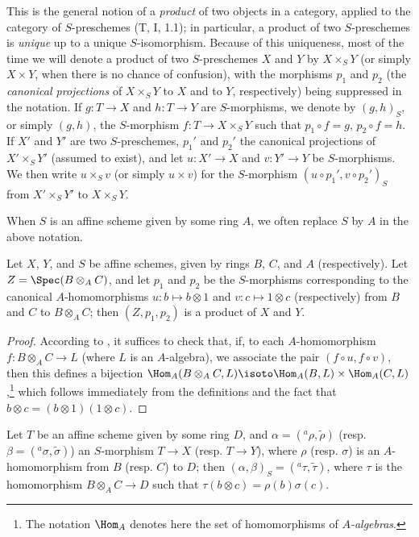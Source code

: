 This is the general notion of a \emph{product} of two objects in a category, applied
to the category of $S$-preschemes (T, I, 1.1); in particular, a product of two $S$-preschemes
is \emph{unique} up to a unique $S$-isomorphism. Because of this uniqueness, most of the time
we will denote a product of two $S$-preschemes $X$ and $Y$ by $X\times_S Y$ (or
simply $X\times Y$, when there is no chance of confusion), with the morphisms $p_1$ and $p_2$
(the \emph{canonical projections} of $X\times_S Y$ to $X$ and to $Y$, respectively) being suppressed
in the notation. If $g:T\to X$ and $h:T\to Y$ are $S$-morphisms, we denote by $(g,h)_S$, or
simply $(g,h)$, the $S$-morphism $f:T\to X\times_S Y$ such that $p_1\circ f=g$,
$p_2\circ f=h$. If $X'$ and $Y'$ are two $S$-preschemes, $p_1'$ and $p_2'$ the canonical
  projections of $X'\times_S Y'$ (assumed to exist), and let $u:X'\to X$ and
  $v:Y'\to Y$ be $S$-morphisms. We then write $u\times_S v$ (or simply $u\times v$)
  for the $S$-morphism
  $(u\circ p_1',v\circ p_2')_S$ from $X'\times_S Y'$ to $X\times_S Y$.

When $S$ is an affine scheme given by some ring $A$, we often replace $S$
by $A$ in the above notation.

\begin{proposition}[3.2.2]
\label{I.3.2.2}
Let $X$, $Y$, and $S$ be affine schemes, given by rings $B$, $C$, and $A$ (respectively). Let
$Z=\Spec(B\otimes_A C)$, and let $p_1$ and $p_2$ be the $S$-morphisms corresponding  to
the canonical $A$-homomorphisms $u:b\mapsto b\otimes 1$ and $v:c\mapsto 1\otimes c$ (respectively) from $B$
and $C$ to $B\otimes_A C$; then $(Z,p_1,p_2)$ is a product of $X$ and $Y$.
\end{proposition}

\begin{proof}
According to , it suffices to check that, if, to each $A$-homomorphism
$f:B\otimes_A C\to L$ (where $L$ is an $A$-algebra), we associate the pair
$(f\circ u,f\circ v)$, then this defines a bijection
$\Hom_A(B\otimes_A C,L)\isoto\Hom_A(B,L)\times\Hom_A(C,L)$,\footnote{The notation $\Hom_A$
denotes here the set of homomorphisms of \emph{$A$-algebras}.} which follows immediately
from the definitions and the fact that $b\otimes c=(b\otimes 1)(1\otimes c)$.
\end{proof}

\begin{corollary}[3.2.3]
\label{I.3.2.3}
Let $T$ be an affine scheme given by some ring $D$, and $\alpha=({}^a\rho,\widetilde{\rho})$
(resp. $\beta=({}^a\sigma,\widetilde{\sigma})$) an $S$-morphism $T\to X$ (resp. $T\to Y$),
where $\rho$ (resp. $\sigma$) is an $A$-homomorphism from $B$ (resp. $C$) to $D$; then
$(\alpha,\beta)_S=({}^a\tau,\widetilde{\tau})$, where $\tau$ is the homomorphism
$B\otimes_A C\to D$ such that $\tau(b\otimes c)=\rho(b)\sigma(c)$.
\end{corollary}

